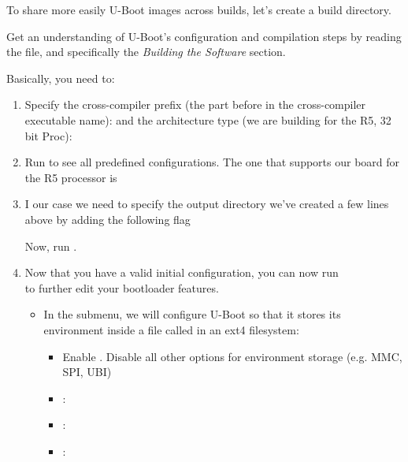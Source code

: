 To share more easily U-Boot images across builds, let's create a build directory.


Get an understanding of U-Boot's configuration and compilation steps
by reading the  file, and specifically the {\em Building
the Software} section.

Basically, you need to:

\begin{enumerate}

\item Specify the cross-compiler prefix
(the part before  in the cross-compiler executable name):
and the architecture type (we are building for the R5, 32 bit Proc):

\item Run  to see all predefined
      configurations. The one that supports our board for the R5 processor is
\item I our case we need to specify the output directory we've
      created a few lines above by adding the following
      flag 

      Now, run .

\item Now that you have a valid initial configuration, you can now run \\
   to further edit your bootloader features.
  \begin{itemize}
    \item In the  submenu, we will configure U-Boot so
    that it stores its environment inside a file called 
    in an ext4 filesystem:
    \begin{itemize}
      \item Enable . Disable all other
          options for environment storage (e.g. MMC, SPI, UBI)
      \item {}: 
      \item {}: 
      \item {}: 
    \end{itemize}


\end{itemize}
\end{enumerate}
